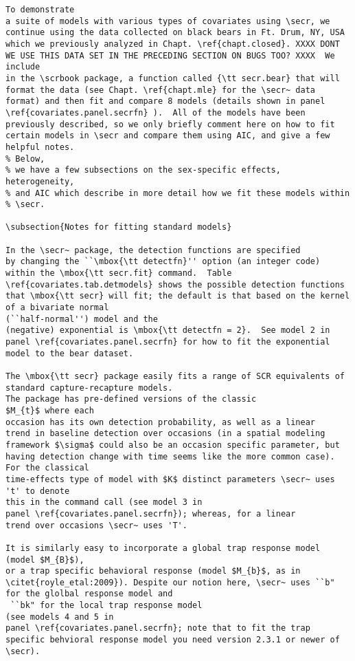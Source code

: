 {\begin{verbatim}
To demonstrate
a suite of models with various types of covariates using \secr, we
continue using the data collected on black bears in Ft. Drum, NY, USA
which we previously analyzed in Chapt. \ref{chapt.closed}. XXXX DONT WE USE THIS DATA SET IN THE PRECEDING SECTION ON BUGS TOO? XXXX  We include
in the \scrbook package, a function called {\tt secr.bear} that will 
format the data (see Chapt. \ref{chapt.mle} for the \secr~ data format) and then fit and compare 8 models (details shown in panel 
\ref{covariates.panel.secrfn} ).  All of the models have been 
previously described, so we only briefly comment here on how to fit
certain models in \secr and compare them using AIC, and give a few helpful notes.  
% Below, 
% we have a few subsections on the sex-specific effects, heterogeneity,
% and AIC which describe in more detail how we fit these models within
% \secr.

\subsection{Notes for fitting standard models}

In the \secr~ package, the detection functions are specified
by changing the ``\mbox{\tt detectfn}'' option (an integer code)
within the \mbox{\tt secr.fit} command.  Table
\ref{covariates.tab.detmodels} shows the possible detection functions
that \mbox{\tt secr} will fit; the default is that based on the kernel
of a bivariate normal
(``half-normal'') model and the
(negative) exponential is \mbox{\tt detectfn = 2}.  See model 2 in 
panel \ref{covariates.panel.secrfn} for how to fit the exponential 
model to the bear dataset. 

The \mbox{\tt secr} package easily fits a range of SCR equivalents of standard capture-recapture models.
The package has pre-defined versions of the classic
$M_{t}$ where each
occasion has its own detection probability, as well as a linear
trend in baseline detection over occasions (in a spatial modeling framework $\sigma$ could also be an occasion specific parameter, but having detection change with time seems like the more common case). For the classical
time-effects type of model with $K$ distinct parameters \secr~ uses 't' to denote
this in the command call (see model 3 in 
panel \ref{covariates.panel.secrfn}); whereas, for a linear
trend over occasions \secr~ uses 'T'.

It is similarly easy to incorporate a global trap response model (model $M_{B}$), 
or a trap specific behavioral response (model $M_{b}$, as in
\citet{royle_etal:2009}). Despite our notion here, \secr~ uses ``b" for the glolbal response model and
 ``bk" for the local trap response model
(see models 4 and 5 in 
panel \ref{covariates.panel.secrfn}; note that to fit the trap specific behvioral response model you need version 2.3.1 or newer of \secr).


\end{verbatim}}
